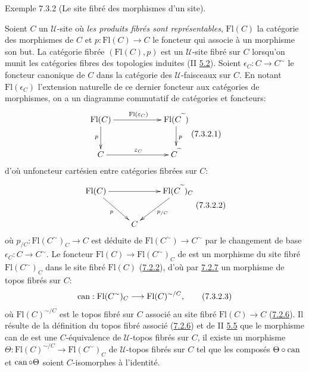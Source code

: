 \documentclass[10pt]{../fichiers-configuration-latex/smfart}
\begin{document}
\begin{enonce*}[remark]{Exemple 7.3.2}
(Le site fibré des morphismes d'un site).

Soient $C$ un $𝒰$-site où \emph{les produits fibrés sont
  représentables}, $\text{Fl}(C)$ la catégorie des morphismes de $C$ et $p :
  \text{Fl}(C) \to C$ le foncteur qui associe à un morphisme son but. La
  catégorie fibrée $(\text{Fl}(C), p)$ est un $𝒰$-site fibré sur $C$
  lorsqu'on munit les catégories fibres des topologies induites (II
  \hyperref[VI.cor5.2]{5.2}). Soient $\epsilon_C  : C \to C^{\sim}$ le foncteur canonique
  de $C$ dans la catégorie des $𝒰$-faisceaux sur $C$. En notant
  $\text{Fl}(\epsilon_C)$ l'extension naturelle de ce dernier foncteur aux
  catégories de morphismes, on a un diagramme commutatif de
  catégories et foncteurs:
\[\vcenter{
\xymatrix@C=2cm{
\text{Fl}(C) \ar[r]^{\text{Fl}(\varepsilon_C)}\ar[d]_{p}& \text{Fl}(C^{\widetilde{\phantom{a}}}) \ar[d]^{p}\\
C       \ar[r]^{\varepsilon_C} & C^{\widetilde{\phantom{a}}}
}}\leqno{(7.3.2.1)}
\]
d'où un\pageoriginale foncteur cartésien entre catégories
fibrées sur
$C$:
\[\vcenter{
\xymatrix{
\text{Fl}(C) \ar[rr] \ar[rd]_{p}&     &
\text{Fl}(C^{\widetilde{\phantom{a}}})_C \ar[ld]^{p_{/C}}\\
                   & C     &\\
}}\leqno{(7.3.2.2)}
\]
où $p_{/C} : \text{Fl}(C^{\sim})_{C} \to C$ est déduite de
$\text{Fl}(C^{\sim}) \to
C^{\sim}$ par le changement de base $\epsilon_{C} : C \to
C^{\sim}$. Le foncteur $\text{Fl}(C) \to \text{Fl}(C^{\sim})_{C}$ de
 est un morphisme du site fibré
$\text{Fl}(C^{\sim})_{C}$ dans le site fibré
$\text{Fl}(C)$
(\hyperref[VI.subsubsec7.2.2]{7.2.2}), d'où par \hyperref[VI.prop7.2.7]{7.2.7} un morphisme de topos fibrés sur $C$:
\begin{equation*}
\can : \text{Fl}(C^{\sim})_{C} \to \text{Fl} (C)^{\sim/C}{\quoi},\tag{7.3.2.3}
\end{equation*}
où $\text{Fl}(C)^{\sim/C}$ est le topos fibré sur $C$ associé au site fibré
$\text{Fl}(C) \to C$ (\hyperref[VI.subsubsec7.2.6]{7.2.6}). Il résulte de la définition du topos fibré
associé (\hyperref[VI.subsubsec7.2.6]{7.2.6}) et de II \hyperref[VI.cor5.5]{5.5} que le morphisme can de  est une
$C$-équivalence de $𝒰$-topos fibrés sur $C$, \ie il existe un
morphisme $\Theta : \text{Fl}(C)^{\sim/C} \to \text{Fl} (C^{\sim})_C$
de $𝒰$-topos fibrés sur $C$ tel que les composés $\Theta \circ \operatorname{can}$ et $\operatorname{can} \circ
\Theta$ soient $C$-isomorphes à l'identité.


\end{enonce*}
\end{document}
